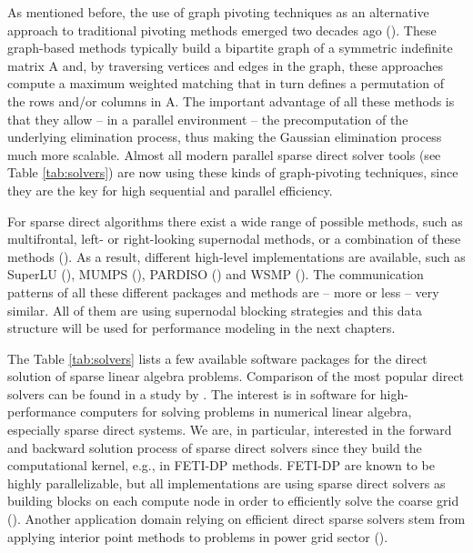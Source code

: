 As mentioned before, the use of graph pivoting techniques as an alternative approach to traditional pivoting methods emerged two decades ago (\cite{schenk-2004}). These graph-based methods
typically build a bipartite graph of a symmetric indefinite matrix A and, by traversing vertices and edges in the graph, these approaches compute a maximum weighted matching that
in turn defines a permutation of the rows and/or columns in A. The important advantage of
all these methods is that they allow -- in a parallel environment -- the precomputation of the
underlying elimination process, thus making the Gaussian elimination process much more
scalable. Almost all modern parallel sparse direct solver tools (see Table \ref{tab:solvers})
are now using these kinds of graph-pivoting techniques, since they are the key for high sequential and parallel efficiency.

For sparse direct algorithms there exist a wide range of possible methods, such as multifrontal, left- or right-looking supernodal methods, or a combination of these methods (\cite{doi:10.1137/1.9780898718881}). As a result, different high-level implementations are available, such as SuperLU (\cite{superlu_dist}), MUMPS (\cite{amestoy:2000:mpd}), PARDISO (\cite{schenk-2004,schenk-2006,Bollhofer2020}) and WSMP (\cite{gup02}). The communication patterns of all these different packages and methods are -- more or less -- very similar. All of them are using supernodal blocking strategies and this data structure will be used for performance modeling in the next chapters.

The Table \ref{tab:solvers} lists a few available software packages for the direct solution of sparse linear algebra problems. {\color{blue} Comparison of the most popular direct solvers can be found in a study by \cite{10.1145/1236463.1236465}.} The interest is in software for high-performance computers for solving problems in numerical linear algebra, especially sparse direct systems.
We are, in particular, interested in the forward and backward solution process of sparse direct solvers since they build the computational kernel, e.g., in FETI-DP methods. FETI-DP are known to be highly parallelizable, but all implementations are using sparse direct solvers as building blocks on each compute node in order to efficiently solve the coarse grid (\cite{ISI:000471881700007,ISI:000469334300010,klawonn-fetidp}).
{\color{blue} Another application domain relying on efficient direct sparse solvers stem from applying interior point methods to problems in power grid sector (\cite{8846109}).}

